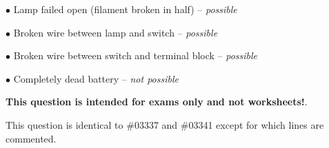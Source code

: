 \medskip
\item{$\bullet$} Lamp failed open (filament broken in half) -- {\it possible}
\item{$\bullet$} Broken wire between lamp and switch -- {\it possible}
\item{$\bullet$} Broken wire between switch and terminal block -- {\it possible}
\item{$\bullet$} Completely dead battery -- {\it not possible}
\medskip







{\bf This question is intended for exams only and not worksheets!}.

This question is identical to \#03337 and \#03341 except for which lines are commented.



